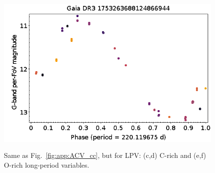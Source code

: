 \documentclass[longauth]{aa}
\begin{document}
\begin{appendix}
\begin{figure}
\hspace{2mm}
 \includegraphics[width=0.45\hsize]{figures/appendix/O-rich_LPV-79.png} \\
\vspace{4mm}
 \caption{Same as Fig.~\ref{fig:app:ACV_cc}, but for LPV: (c,d) C-rich and (e,f) O-rich long-period variables.}
 \label{fig:app:LPV_cc}
\end{figure}




\end{appendix}
\end{document}
